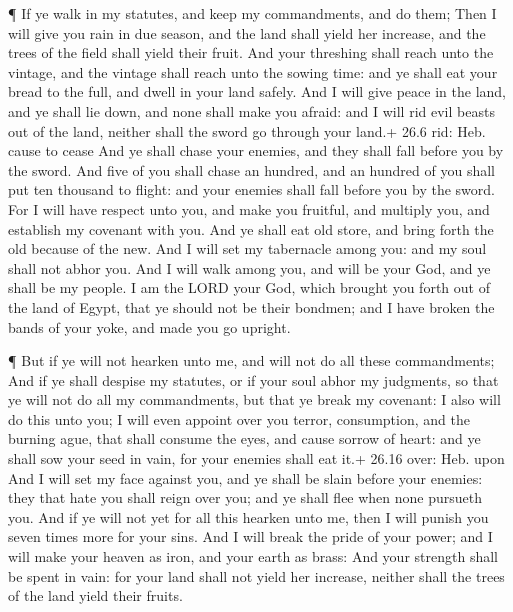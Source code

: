  ¶ If ye walk in my statutes, and keep my commandments, and
do them;  Then I will give you rain in due season, and the
land shall yield her increase, and the trees of the field shall yield
their fruit.  And your threshing shall reach unto the
vintage, and the vintage shall reach unto the sowing time: and ye shall
eat your bread to the full, and dwell in your land safely. 
And I will give peace in the land, and ye shall lie down, and none shall
make you afraid: and I will rid evil beasts out of the land, neither
shall the sword go through your land.+ 26.6 rid: Heb. cause to cease
 And ye shall chase your enemies, and they shall fall before
you by the sword.  And five of you shall chase an hundred,
and an hundred of you shall put ten thousand to flight: and your enemies
shall fall before you by the sword.  For I will have respect
unto you, and make you fruitful, and multiply you, and establish my
covenant with you.  And ye shall eat old store, and bring
forth the old because of the new.  And I will set my
tabernacle among you: and my soul shall not abhor you.  And
I will walk among you, and will be your God, and ye shall be my people.
 I am the LORD your God, which brought you forth out of the
land of Egypt, that ye should not be their bondmen; and I have broken
the bands of your yoke, and made you go upright.

 ¶ But if ye will not hearken unto me, and will not do all
these commandments;  And if ye shall despise my statutes,
or if your soul abhor my judgments, so that ye will not do all my
commandments, but that ye break my covenant:  I also will
do this unto you; I will even appoint over you terror, consumption, and
the burning ague, that shall consume the eyes, and cause sorrow of
heart: and ye shall sow your seed in vain, for your enemies shall eat
it.+ 26.16 over: Heb. upon  And I will set my face against
you, and ye shall be slain before your enemies: they that hate you shall
reign over you; and ye shall flee when none pursueth you. 
And if ye will not yet for all this hearken unto me, then I will punish
you seven times more for your sins.  And I will break the
pride of your power; and I will make your heaven as iron, and your earth
as brass:  And your strength shall be spent in vain: for
your land shall not yield her increase, neither shall the trees of the
land yield their fruits.

